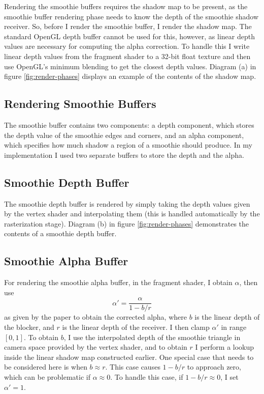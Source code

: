 \documentclass[sigconf]{acmart}
\begin{document}
Rendering the smoothie buffers requires the shadow map to be present, as the smoothie buffer rendering phase needs to know the depth of the smoothie shadow receiver. So, before I render the smoothie buffer, I render the shadow map. The standard OpenGL depth buffer cannot be used for this, however, as linear depth values are necessary for computing the alpha correction. To handle this I write linear depth values from the fragment shader to a 32-bit float texture and then use OpenGL's minimum blending to get the closest depth values. Diagram (a) in figure \ref{fig:render-phases} displays an example of the contents of the shadow map.

\subsection{Rendering Smoothie Buffers}

The smoothie buffer contains two components: a depth component, which stores the depth value of the smoothie edges and corners, and an alpha component, which specifies how much shadow a region of a smoothie should produce. In my implementation I used two separate buffers to store the depth and the alpha.

\subsection{Smoothie Depth Buffer}

The smoothie depth buffer is rendered by simply taking the depth values given by the vertex shader and interpolating them (this is handled automatically by the rasterization stage). Diagram (b) in figure \ref{fig:render-phases} demonstrates the contents of a smoothie depth buffer.

\subsection{Smoothie Alpha Buffer}

For rendering the smoothie alpha buffer, in the fragment shader, I obtain $\alpha$, then use \[ \alpha' = \frac{\alpha}{1 - b/r}  \] as given by the paper to obtain the corrected alpha, where $b$ is the linear depth of the blocker, and $r$ is the linear depth of the receiver. I then clamp $\alpha'$ in range $[0, 1]$. To obtain $b$, I use the interpolated depth of the smoothie triangle in camera space provided by the vertex shader, and to obtain $r$ I perform a lookup inside the linear shadow map constructed earlier. One special case that needs to be considered here is when $b \approx r$. This case causes $1 - b/r$ to approach zero, which can be problematic if $\alpha \approx 0$. To handle this case, if $1 - b/r \approx 0$, I set $\alpha' = 1$.
\end{document}
